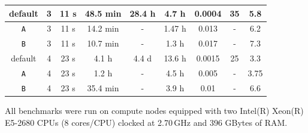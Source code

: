 \documentclass[a4paper,12pt]{scrartcl}
\begin{document}
\begin{table}[htpb]
\begin{center}
\begin{tabular}[\linewidth]{ccccccccc}
%
    default   &3 & 11 s  & 48.5 min & 28.4 h & 4.7 h   & 0.0004& 35  & 5.8   \\\hline%
    \texttt{A}&3 & 11 s  & 14.2 min & -      & 1.47 h  & 0.013 & -   & 6.2   \\\hline%
    \texttt{B}&3 & 11 s  & 10.7 min & -      & 1.3 h   & 0.017 & -   & 7.3   \\\hline\hline%
%
    default   &4 & 23 s  & 4.1 h    & 4.4 d  & 13.6 h  & 0.0015& 25  & 3.3    \\\hline%
    \texttt{A}&4 & 23 s  & 1.2 h    & -      & 4.5 h   & 0.005 & -   & 3.75   \\\hline%
    \texttt{B}&4 & 23 s  & 35.4 min & -      & 3.9 h   & 0.01  & -   & 6.6    \\\hline%
  \end{tabular}
  \end{center}
\end{table}
All benchmarks were run on compute nodes equipped with
two Intel(R) Xeon(R) E5-2680 CPUs (8 cores/CPU) clocked at
2.70\,GHz and 396 GBytes of RAM.
\end{document}
